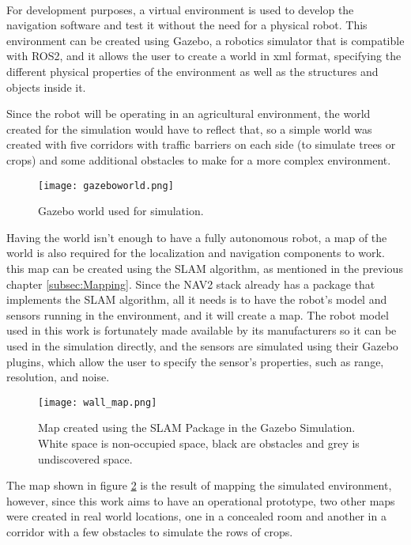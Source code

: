 \paragraph{}For development purposes, a virtual environment is used to develop the navigation software 
and test it without the need for a physical robot. This environment can be created using Gazebo, a 
robotics simulator that is compatible with \gls{ROS2}, and it allows the user to create a world in xml format, specifying 
the different physical properties of the environment as well as the structures and objects inside it.

Since the robot will be operating in an agricultural environment, the world created for 
the simulation would have to reflect that, so a simple world was created with five 
corridors with traffic barriers on each side (to simulate trees or crops) and some additional 
obstacles to make for a more complex environment.
\begin{figure}[H]
    \centering
    \texttt{[image: gazeboworld.png]}
    \caption{Gazebo world used for simulation.}
    \label{fig:gazebo_world}
\end{figure}

Having the world isn't enough to have a fully autonomous robot, a map 
of the world is also required for the localization and navigation components to work. 
this map can be created using the \gls{SLAM} algorithm, as mentioned in the previous chapter \ref{subsec:Mapping}. 
Since the \gls{NAV2} stack already has a package that implements the \gls{SLAM} algorithm, all it needs is to 
have the robot's model and sensors running in the environment, and it will create a map.
The robot model used in this work is fortunately made available by its manufacturers 
so it can be used in the simulation directly, and the sensors are simulated using their 
Gazebo plugins, which allow the user to specify the sensor's properties, such as range, resolution, and noise.
\begin{figure}
    \centering
    \texttt{[image: wall\_map.png]}
    \caption{Map created using the SLAM Package in the Gazebo Simulation. White space is non-occupied space, black are obstacles and grey is undiscovered space.}
    \label{fig:slam_map}
\end{figure}
\clearpage

The map shown in figure \ref{fig:slam_map} is the result of mapping the simulated environment, 
however, since this work aims to have an operational prototype, two other maps were created 
in real world locations, one in a concealed room and another in a corridor with a few obstacles to simulate the rows 
of crops. 

